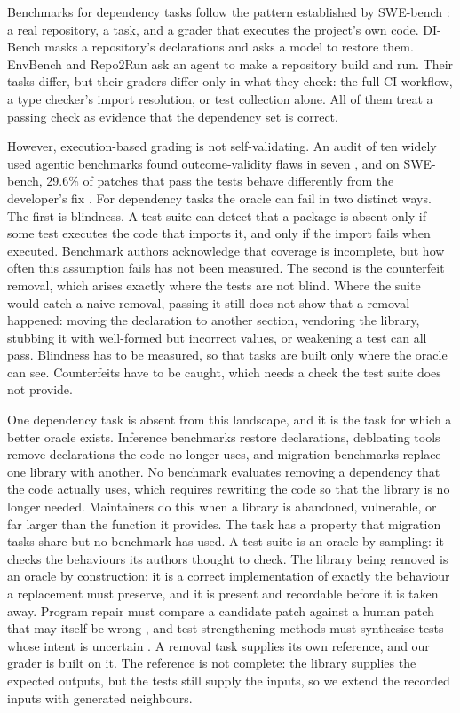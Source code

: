 \documentclass[11pt]{article}
\newcommand{\dibench}{DI-Bench}
\begin{document}
Benchmarks for dependency tasks follow the pattern established by SWE-bench \citep{jimenez2024swebench}: a real repository, a task, and a grader that executes the project's own code.
\dibench{} \citep{dibench2025} masks a repository's declarations and asks a model to restore them.
EnvBench \citep{envbench2025} and Repo2Run \citep{repo2run2025} ask an agent to make a repository build and run.
Their tasks differ, but their graders differ only in what they check: the full CI workflow, a type checker's import resolution, or test collection alone.
All of them treat a passing check as evidence that the dependency set is correct.

However, execution-based grading is not self-validating.
An audit of ten widely used agentic benchmarks found outcome-validity flaws in seven \citep{abc2025}, and on SWE-bench, 29.6\% of patches that pass the tests behave differently from the developer's fix \citep{patchdiff2026}.
For dependency tasks the oracle can fail in two distinct ways.
The first is blindness. A test suite can detect that a package is absent only if some test executes the code that imports it, and only if the import fails when executed.
Benchmark authors acknowledge that coverage is incomplete, but how often this assumption fails has not been measured.
The second is the counterfeit removal, which arises exactly where the tests are not blind.
Where the suite would catch a naive removal, passing it still does not show that a removal happened: moving the declaration to another section, vendoring the library, stubbing it with well-formed but incorrect values, or weakening a test can all pass.
Blindness has to be measured, so that tasks are built only where the oracle can see.
Counterfeits have to be caught, which needs a check the test suite does not provide.

One dependency task is absent from this landscape, and it is the task for which a better oracle exists.
Inference benchmarks restore declarations, debloating tools \citep{pytrim2025,soto2021longitudinal} remove declarations the code no longer uses, and migration benchmarks \citep{pymigbench2023} replace one library with another.
No benchmark evaluates removing a dependency that the code actually uses, which requires rewriting the code so that the library is no longer needed.
Maintainers do this when a library is abandoned, vulnerable, or far larger than the function it provides.
The task has a property that migration tasks share but no benchmark has used.
A test suite is an oracle by sampling: it checks the behaviours its authors thought to check.
The library being removed is an oracle by construction: it is a correct implementation of exactly the behaviour a replacement must preserve, and it is present and recordable before it is taken away.
Program repair must compare a candidate patch against a human patch that may itself be wrong \citep{ye2021rgt,patchdiff2026}, and test-strengthening methods must synthesise tests whose intent is uncertain \citep{sting2026}.
A removal task supplies its own reference, and our grader is built on it.
The reference is not complete: the library supplies the expected outputs, but the tests still supply the inputs, so we extend the recorded inputs with generated neighbours.
\end{document}
